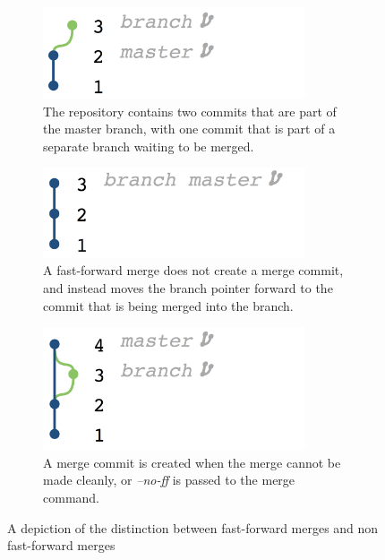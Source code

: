 \begin{figure}[htpb]
  \centering

  \begin{subfigure}[b]{0.5\textwidth}
    \includegraphics[width=0.85\textwidth]{Figures/background/fastforward/fastforward_2.png}
    \caption{The repository contains two commits that are part of the
      master branch, with one commit that is part of a separate branch
      waiting to be merged.}
  \end{subfigure}

  \begin{subfigure}[b]{0.5\textwidth}
    \includegraphics[width=0.85\textwidth]{Figures/background/fastforward/fastforward_3.png}
    \caption{A fast-forward merge does not create a merge commit,
      and instead moves the branch pointer forward to the commit that is
      being merged into the branch.}
    \label{fig:fast_forwarded_merge}
  \end{subfigure}

  \begin{subfigure}[b]{0.5\textwidth}
    \includegraphics[width=0.85\textwidth]{Figures/background/fastforward/fastforward_4.png}
    \caption{A merge commit is created when the merge cannot be made
      cleanly, or \textit{--no-ff} is passed to the merge command.}
    \label{fig:merge_node_merge}
  \end{subfigure}
  \caption{A depiction of the distinction between fast-forward merges
    and non fast-forward merges}
  \label{fig:merge_styles}
\end{figure}

